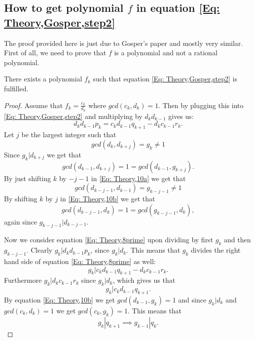 \subsection{How to get polynomial $f$ in equation \ref{Eq: Theory,Gosper,step2}}\label{Sub: getf}
The proof provided here is just due to Gosper's paper and mostly very similar. First of all, we need to prove that $f$ is a polynomial and not a rational polynomial.
\begin{theorem}
  There exists a polynomial $f_k$ such that equation \ref{Eq: Theory,Gosper,step2} is fulfilled.
\end{theorem}
\begin{proof}
  Assume that $f_k=\frac{c_k}{d_k}$ where $gcd(c_k,d_k)=1$. Then by plugging this into \ref{Eq: Theory,Gosper,step2} and multiplying by $d_kd_{k-1}$ gives us:
  \begin{equation}\label{Eq: Theory,8prime}
    d_kd_{k-1}p_k = c_kd_{k-1}q_{k+1} - d_kc_{k-1}r_k.
  \end{equation}
  Let $j$ be the largest integer such that
  \begin{equation}\label{Eq: Theory,10a}
    gcd(d_k,d_{k+j})=g_k\neq 1
  \end{equation}
  Since $g_k|d_{k+j}$ we get that
  \begin{equation}\label{Eq: Theory,10b}
    gcd(d_{k-1},d_{k+j})=1=gcd(d_{k-1},g_{k+j}).
  \end{equation}
  By just shifting $k$ by $-j-1$ in \ref{Eq: Theory,10a} we get that
  \begin{equation}\label{Eq: Theory,10c}
    gcd(d_{k-j-1},d_{k-1})=g_{k-j-1}\neq 1
  \end{equation}
  By shifting $k$ by $j$ in \ref{Eq: Theory,10b} we get that
  \begin{equation}\label{Eq: Theory,10d}
    gcd(d_{k-j-1},d_k) = 1 = gcd(g_{k-j-1},d_k),
  \end{equation}
  again since $g_{k-j-1}|d_{k-j-1}$.

  Now we consider equation \ref{Eq: Theory,8prime} upon dividing by first $g_k$ and then $g_{k-j-1}$. Clearly $g_k|d_kd_{k-1}p_k$, since $g_k|d_k$. This means that $g_k$ divides the right hand side of equation \ref{Eq: Theory,8prime} as well:
  \begin{equation}
    g_k|c_kd_{k-1}q_{k+1}-d_kc_{k-1}r_k.
  \end{equation}
  Furthermore $g_k|d_kc_{k-1}r_k$ since $g_k|d_k$, which gives us that
  \begin{equation}
    g_k|c_kd_{k-1}q_{k+1}.
  \end{equation}
  By equation \ref{Eq: Theory,10b} we get $gcd(d_{k-1},g_k)=1$ and since $g_k|d_k$ and $gcd(c_k,d_k)=1$ we get $gcd(c_k,g_k)=1$. This means that
  \begin{equation}
    g_k|q_{k+1} \implies g_{k-1}|q_k.
  \end{equation}


\end{proof}
